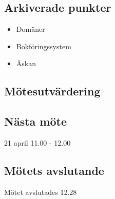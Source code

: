 \documentclass[protokoll]{dvd}
\begin{document}
\subsection{Arkiverade punkter}
\begin{itemize}
    \item Domäner
    \item Bokföringssystem
    \item Äskan
\end{itemize}

\subsection{Mötesutvärdering}

\subsection{Nästa möte}
21 april 11.00 - 12.00

\subsection{Mötets avslutande}

Mötet avslutades 12.28

\styrelsesignaturer
\end{document}
